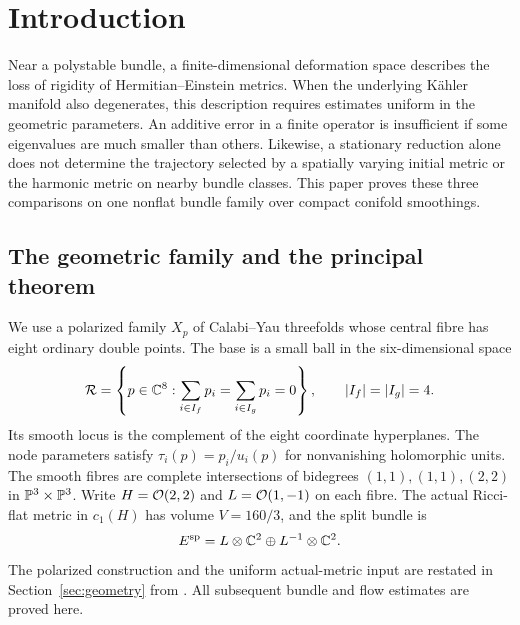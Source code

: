 \section{Introduction}
\label{sec:introduction}

Near a polystable bundle, a finite-dimensional deformation
space describes the loss of rigidity of Hermitian--Einstein
metrics. When the underlying Kähler manifold also degenerates,
this description requires estimates uniform in the geometric
parameters. An additive error in a finite operator is
insufficient if some eigenvalues are much smaller than
others. Likewise, a stationary reduction alone does not
determine the trajectory selected by a spatially varying
initial metric or the harmonic metric on nearby bundle
classes. This paper proves these three comparisons on one
nonflat bundle family over compact conifold smoothings.

\subsection{The geometric family and the principal theorem}

We use a polarized family $X_p$ of Calabi--Yau threefolds
whose central fibre has eight ordinary double points.
The base is a small ball in the six-dimensional space
\begin{equation}\label{eq:intro-base}
 \mathcal R=\left\{p\in\mathbb C^8:
       \sum_{i\in I_f}p_i=\sum_{i\in I_g}p_i=0\right\},
 \qquad |I_f|=|I_g|=4.
\end{equation}
Its smooth locus is the complement of the eight coordinate
hyperplanes. The node parameters satisfy
$\tau_i(p)=p_i/u_i(p)$ for nonvanishing holomorphic units.
The smooth fibres are complete intersections of bidegrees
$(1,1),(1,1),(2,2)$ in $\mathbb P^3\times\mathbb P^3$.
Write $H=\mathcal O(2,2)$ and $L=\mathcal O(1,-1)$ on each fibre.
The actual Ricci-flat metric in $c_1(H)$ has volume
$V=160/3$, and the split bundle is
\[
                 E^{\rm sp}=L\otimes\mathbb C^2\oplus L^{-1}\otimes\mathbb C^2.
\]
The polarized construction and the uniform actual-metric
input are restated in Section~\ref{sec:geometry} from
\cite{W_Hodge}. All subsequent bundle and flow estimates
are proved here.

